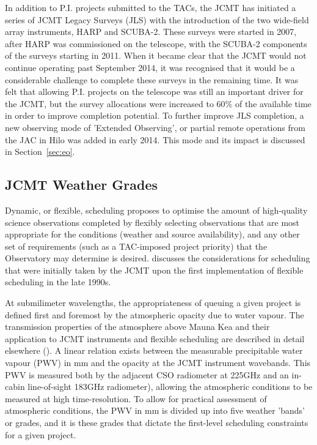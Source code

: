 \documentclass[]{spie}  %
\begin{document}
In addition to P.I. projects submitted to the TACs, the JCMT has
initiated a series of JCMT Legacy Surveys (JLS) with the introduction
of the two wide-field array instruments, HARP and SCUBA-2. These
surveys were started in 2007, after HARP was commissioned on the
telescope, with the SCUBA-2 components of the surveys starting in
2011. When it became clear that the JCMT would not continue operating
past September 2014, it was recognised that it would be a considerable
challenge to complete these surveys in the remaining time. It was felt
that allowing P.I. projects on the telescope was still an important
driver for the JCMT, but the survey allocations were increased to
60$\%$ of the available time in order to improve completion
potential. To further improve JLS completion, a new observing mode of
'Extended Observing', or partial remote operations from the JAC in
Hilo was added in early 2014. This mode and its impact is discussed in
Section~\ref{sec:eo}.

\subsection{JCMT Weather Grades}

Dynamic, or flexible, scheduling proposes to optimise the amount of
high-quality science observations completed by flexibly selecting
observations that are most appropriate for the conditions (weather and
source availability), and any other set of requirements (such as a
TAC-imposed project priority) that the Observatory may determine is
desired. \cite{tilanus2000} discusses the considerations for
scheduling that were initially taken by the JCMT upon the first
implementation of flexible scheduling in the late 1990s.

At submilimeter wavelengths, the appropriateness of queuing a given
project is defined first and foremost by the atmospheric opacity due
to water vapour. The transmission properties of the atmosphere above
Mauna Kea and their application to JCMT instruments and flexible
scheduling are described in detail elsewhere (\cite{robson2002}). A
linear relation exists between the measurable precipitable water
vapour (PWV) in mm and the opacity at the JCMT instrument
wavebands. This PWV is measured both by the adjacent CSO radiometer at
225GHz and an in-cabin line-of-sight 183GHz radiometer\cite{wiedner}),
allowing the atmospheric conditions to be measured at high
time-resolution. To allow for practical assessment of atmospheric
conditions, the PWV in mm is divided up into five weather 'bands' or
grades, and it is these grades that dictate the first-level scheduling
constraints for a given project.
\end{document}
